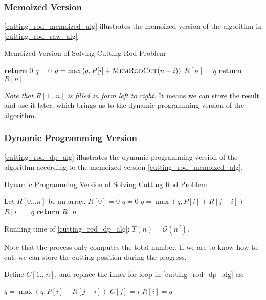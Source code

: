 \subsubsection{Memoized Version}
\cref{cutting_rod_memoized_alg} illustrates the memoized version of the algorithm in \cref{cutting_rod_raw_alg}
\begin{algorithm}[H]
\caption{Memoized Version of Solving Cutting Rod Problem}\label{cutting_rod_memoized_alg}
\begin{algorithmic}[1]
 
    \State \textbf{return} {$0$}
\EndIf
{}
    \State $q=0$
        \State $q = \max\left(q, P[i]+\textsc{MemRodCut}(n-i)\right)$
    \EndFor
    \State $R[n] = q$
\EndIf
\State \textbf{return} {$R[n]$}
\EndProcedure
\end{algorithmic}
\end{algorithm}

\emph{Note that $R[1...n]$ is filled in form \underline{left to right}.} It means we can store the result and use it later, which brings us to the dynamic programming version of the algorithm.

\subsubsection{Dynamic Programming Version}
\cref{cutting_rod_dp_alg} illustrates the dynamic programming version of the algorithm according to the memoized version \cref{cutting_rod_memoized_alg}.
\begin{algorithm}[H]
\caption{Dynamic Programming Version of Solving Cutting Rod Problem}\label{cutting_rod_dp_alg}
\begin{algorithmic}[1]
\State Let $R[0...n]$ be an array.
\State $R[0] = 0$
    \State $q = 0$
        \State $q = \max(q, P[i] + R[j-i])$
    \EndFor
    \State $R[i] = q$
\EndFor
\State \textbf{return} {$R[n]$}
\EndProcedure
\end{algorithmic}
\end{algorithm}

Running time of \cref{cutting_rod_dp_alg}: $T(n) = \mathcal{O}(n^2)$.

Note that the process only computes the total number. If we are to know how to cut, we can store the cutting position during the progress.

Define $C[1...n]$, and replace the inner for loop in \cref{cutting_rod_dp_alg} as:
\begin{algorithm}[H]
\begin{algorithmic}[1]
    \State $q = \max(q, P[i] + R[j-i])$
    \State $C[j] = i$
\EndFor
\State $R[i] = q$
\end{algorithmic}
\end{algorithm}

